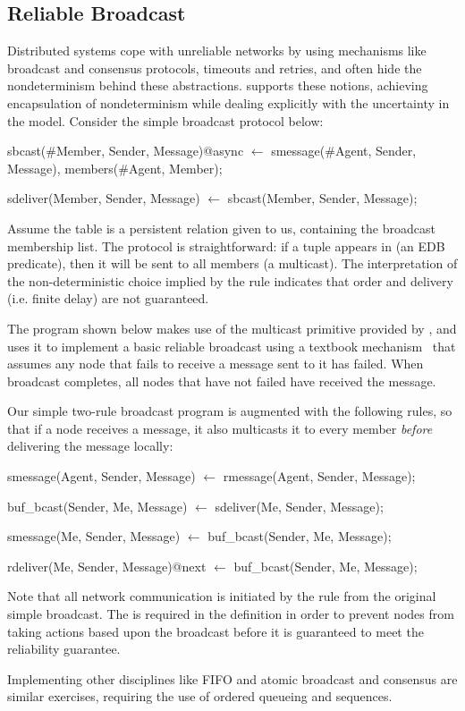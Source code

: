 \subsection{Reliable Broadcast}
Distributed systems cope with unreliable networks by using mechanisms like broadcast and consensus protocols, 
timeouts and retries, and often hide the nondeterminism behind these abstractions.  \lang supports these notions,
achieving encapsulation of nondeterminism while dealing explicitly with the uncertainty in the model.  Consider the simple
broadcast protocol below:

\begin{Dedalus}
sbcast(#Member, Sender, Message)@async \(\leftarrow\)
  smessage(#Agent, Sender, Message),
  members(#Agent, Member);

sdeliver(Member, Sender, Message) \(\leftarrow\)
  sbcast(Member, Sender, Message);
\end{Dedalus}

Assume the table  is a persistent relation given to us, containing the broadcast 
membership list.  
The protocol is straightforward: if a tuple appears in  (an EDB predicate), then
it will be sent to all members (a multicast).  The interpretation of the non-deterministic choice implied by the
 rule indicates that order and delivery (i.e. finite delay) are not guaranteed.

The program shown below makes use of the
multicast primitive provided by , and uses it
to implement a basic reliable broadcast using a textbook
mechanism~\cite{mullender} that assumes any node that fails to receive
a message sent to it has failed.  When broadcast completes, all nodes
that have not failed have received the message.

Our simple two-rule broadcast program is augmented with the following rules, so that if a node receives a message, it 
also multicasts it to every member \emph{before} delivering the message locally:

\begin{Dedalus}
smessage(Agent, Sender, Message)  \(\leftarrow\)
  rmessage(Agent, Sender, Message);

buf_bcast(Sender, Me, Message)  \(\leftarrow\)
  sdeliver(Me, Sender, Message);

smessage(Me, Sender, Message)  \(\leftarrow\)
  buf_bcast(Sender, Me, Message);

rdeliver(Me, Sender, Message)@next  \(\leftarrow\)
  buf_bcast(Sender, Me, Message);
\end{Dedalus}

Note that all network communication is initiated by the
 rule from the original simple broadcast.  The  is
required in the  definition in order to prevent nodes from
taking actions based upon the broadcast before it is guaranteed to
meet the reliability guarantee.

Implementing other disciplines like FIFO and atomic broadcast and
consensus are similar exercises, requiring the use of ordered queueing
and sequences.
